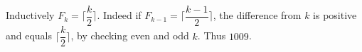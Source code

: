 Inductively $ F_k=\lceil\dfrac{k}{2}\rceil $. Indeed if $ F_{k-1}=\lceil\dfrac{k-1}{2}\rceil $, the difference from $ k $ is positive and equals $\lceil\dfrac{k}{2}\rceil $, by checking even and odd $ k $. Thus $\boxed{1009}$.
